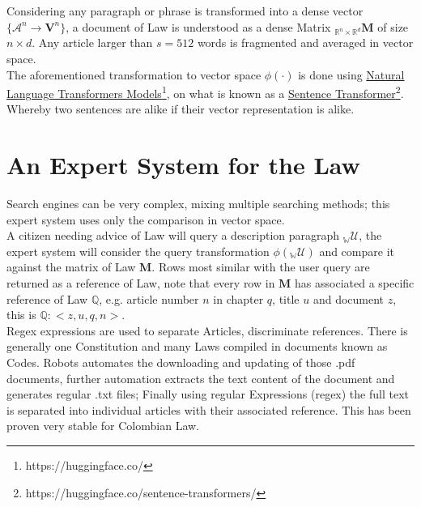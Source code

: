 \documentclass[a4paper,fleqn]{cas-sc}
\begin{document}
\noindent
Considering any paragraph or phrase is transformed into a dense vector $\{\mathcal{A}^{n} \rightarrow \mathbf{V}^{n}\}$, 
a document of Law is understood as a dense Matrix ${}_{\mathbb{R}^{n}\times\mathbb{R}^{d}}{\mathbf{M}}$ of size $n\times{d}$. 
Any article larger than $s=512$ words is fragmented and averaged in vector space. \\
\noindent
The aforementioned transformation to vector space $\phi{}(\cdot{})$ is done using 
\href{https://huggingface.co/}{Natural Language Transformers Models}\footnote{https://huggingface.co/}, on what is known as a 
\href{https://huggingface.co/sentence-transformers/}{Sentence Transformer}\footnote{https://huggingface.co/sentence-transformers/}. 
Whereby two sentences are alike if their vector representation is alike. 


\section{An Expert System for the Law}
Search engines can be very complex, mixing multiple searching methods; 
this expert system uses only the comparison in vector space. \\
\noindent
A citizen needing advice of Law will query a description paragraph ${}_{\mathbb{W}}\mathcal{U}$, 
the expert system will consider the query transformation $\phi({}_{\mathbb{W}}\mathcal{U})$ 
and compare it against the matrix of Law $\mathbf{M}$. 
Rows most similar with the user query are returned as a reference of Law, note that every row in $\mathbf{M}$ 
has associated a specific reference of Law $\mathbb{Q}$, 
e.g. article number $n$ in chapter $q$, title $u$ and document $z$, this is $\mathbb{Q}:<z,u,q,n>$.\\

\noindent
Regex expressions are used to separate Articles, discriminate references. 
There is generally one Constitution and many Laws compiled in documents known as Codes. 
Robots automates the downloading and updating of those .pdf documents, 
further automation extracts the text content of the document and generates regular .txt files; 
Finally using regular Expressions (regex) the full text is separated into individual articles with their associated reference. 
This has been proven very stable for Colombian Law. \\
\end{document}

